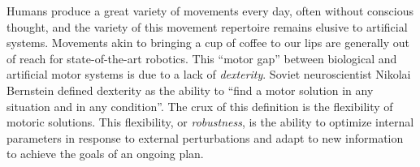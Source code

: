 \documentclass[../main.tex]{subfiles}
\begin{document}

  





\noindent Humans produce a great variety of movements every day, often without conscious thought, and the variety of this movement repertoire remains elusive to artificial systems. Movements akin to bringing a cup of coffee to our lips are generally out of reach for state-of-the-art robotics. This ``motor gap'' between biological and artificial motor systems is due to a lack of \textit{dexterity}. Soviet neuroscientist Nikolai Bernstein defined dexterity as the ability to ``find a motor solution in any situation and in any condition''\cite{Bernstein1967}. The crux of this definition is the flexibility of motoric solutions. This flexibility, or \textit{robustness}\cite{kitanoBiologicalRobustness2004}, is the ability to optimize internal parameters in response to external perturbations and adapt to new information to achieve the goals of an ongoing plan. 
\end{document}
